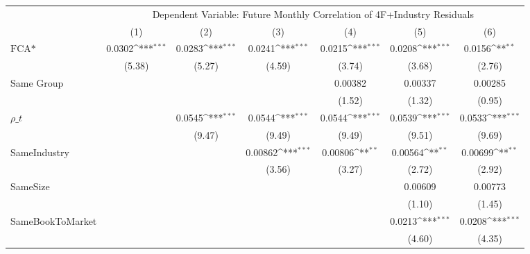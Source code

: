 {
\def\sym#1{\ifmmode^{#1}\else\(^{#1}\)\fi}
\begin{tabular}{l*{6}{c}}
\hline\hline
                &\multicolumn{6}{c}{Dependent Variable: Future Monthly Correlation of 4F+Industry Residuals}                      \\\cmidrule(lr){2-7}
                &\multicolumn{1}{c}{(1)}         &\multicolumn{1}{c}{(2)}         &\multicolumn{1}{c}{(3)}         &\multicolumn{1}{c}{(4)}         &\multicolumn{1}{c}{(5)}         &\multicolumn{1}{c}{(6)}         \\
\hline
$ \text{FCA*} $ &   0.0302\sym{***}&   0.0283\sym{***}&   0.0241\sym{***}&   0.0215\sym{***}&   0.0208\sym{***}&   0.0156\sym{**} \\
                &   (5.38)         &   (5.27)         &   (4.59)         &   (3.74)         &   (3.68)         &   (2.76)         \\
[1em]
Same Group      &                  &                  &                  &  0.00382         &  0.00337         &  0.00285         \\
                &                  &                  &                  &   (1.52)         &   (1.32)         &   (0.95)         \\
[1em]
 $ {\rho\_t} $   &                  &   0.0545\sym{***}&   0.0544\sym{***}&   0.0544\sym{***}&   0.0539\sym{***}&   0.0533\sym{***}\\
                &                  &   (9.47)         &   (9.49)         &   (9.49)         &   (9.51)         &   (9.69)         \\
[1em]
SameIndustry    &                  &                  &  0.00862\sym{***}&  0.00806\sym{**} &  0.00564\sym{**} &  0.00699\sym{**} \\
                &                  &                  &   (3.56)         &   (3.27)         &   (2.72)         &   (2.92)         \\
[1em]
SameSize        &                  &                  &                  &                  &  0.00609         &  0.00773         \\
                &                  &                  &                  &                  &   (1.10)         &   (1.45)         \\
[1em]
SameBookToMarket&                  &                  &                  &                  &   0.0213\sym{***}&   0.0208\sym{***}\\
                &                  &                  &                  &                  &   (4.60)         &   (4.35)         \\

\end{tabular}}
